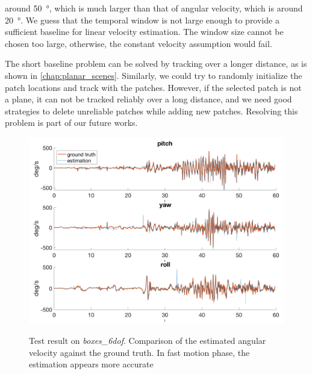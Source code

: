   around \SI{50}{\degree}, which is much larger than that of angular
  velocity, which is around \SI{20}{\degree}. We guess that the
  temporal window is not large enough to provide a sufficient baseline
  for linear velocity estimation. The window size cannot be chosen
  too large, otherwise, the constant velocity assumption would fail.

  The short baseline problem can be solved by tracking over a longer
  distance, as is shown in \cref{chap:planar_scenes}. Similarly, we
  could try to randomly initialize the patch locations and track with
  the patches. However, if the selected patch is not a plane, it can
  not be tracked reliably over a long distance, and we need good
  strategies to delete unreliable patches while adding new
  patches. Resolving this problem is part of our future works.

\begin{figure}
  \centering \includegraphics[width =
  \textwidth]{images/boxes_6dof_rotation_.png}
  \label{fig:boxes_6dof_rotation}
  \caption{Test result on \emph{boxes\_6dof}. Comparison of the
    estimated angular velocity against the ground truth. In fast
    motion phase, the estimation appears more accurate}
\end{figure}

